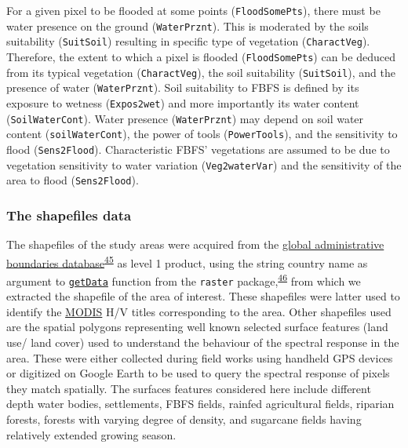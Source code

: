 \documentclass[12pt,oneside]{article}
\begin{document}
For a given pixel to be flooded at some points (\texttt{FloodSomePts}), there must be water presence on the ground (\texttt{WaterPrznt}). This is moderated by the soils suitability (\texttt{SuitSoil}) resulting in specific type of vegetation (\texttt{CharactVeg}). Therefore, the extent to which a pixel is flooded (\texttt{FloodSomePts}) can be deduced from its typical vegetation (\texttt{CharactVeg}), the soil suitability (\texttt{SuitSoil}), and the presence of water (\texttt{WaterPrznt}). Soil suitability to FBFS is defined by its exposure to wetness (\texttt{Expos2wet}) and more importantly its water content (\texttt{SoilWaterCont}). Water presence (\texttt{WaterPrznt}) may depend on soil water content (\texttt{soilWaterCont}), the power of tools (\texttt{PowerTools}), and the sensitivity to flood (\texttt{Sens2Flood}). Characteristic FBFS' vegetations are assumed to be due to vegetation sensitivity to water variation (\texttt{Veg2waterVar}) and the sensitivity of the area to flood (\texttt{Sens2Flood}).

\hypertarget{I32}{%
\subsubsection{The shapefiles data}\label{I32}}

The shapefiles of the study areas were acquired from the \href{https://gadm.org/}{global administrative boundaries database}\textsuperscript{\protect\hyperlink{ref-GADM_2018}{45}} as level 1 product, using the string country name as argument to \href{https://www.rdocumentation.org/packages/raster/versions/2.8-19/topics/getData}{\texttt{getData}} function from the \texttt{raster} package,\textsuperscript{\protect\hyperlink{ref-Hijmans_2019}{46}} from which we extracted the shapefile of the area of interest. These shapefiles were latter used to identify the \href{https://terra.nasa.gov/about/terra-instruments/modis}{MODIS} H/V titles corresponding to the area. Other shapefiles used are the spatial polygons representing well known selected surface features (land use/ land cover) used to understand the behaviour of the spectral response in the area. These were either collected during field works using handheld GPS devices or digitized on Google Earth to be used to query the spectral response of pixels they match spatially. The surfaces features considered here include different depth water bodies, settlements, FBFS fields, rainfed agricultural fields, riparian forests, forests with varying degree of density, and sugarcane fields having relatively extended growing season.
\end{document}
